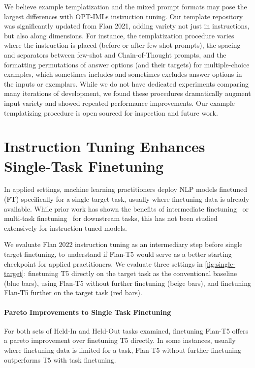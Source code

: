We believe example templatization and the mixed prompt formats may pose the largest differences with OPT-IMLs instruction tuning. Our template repository was significantly updated from Flan 2021, adding variety not just in instructions, but also along dimensions. For instance, the templatization procedure varies where the instruction is placed (before or after few-shot prompts), the spacing and separators between few-shot and Chain-of-Thought prompts, and the formatting permutations of answer options (and their targets) for multiple-choice examples, which sometimes includes and sometimes excludes answer options in the inputs or exemplars. While we do not have dedicated experiments comparing many iterations of development, we found these procedures dramatically augment input variety and showed repeated performance improvements. Our example templatizing procedure is open sourced for inspection and future work.

\section{Instruction Tuning Enhances Single-Task Finetuning}
\label{sec:single-target-ft}

In applied settings, machine learning practitioners deploy NLP models finetuned (FT) specifically for a single target task, usually where finetuning data is already available. While prior work has shown the benefits of intermediate finetuning~\citep{pruksachatkun2020intermediate,vu-etal-2020-exploring} or multi-task finetuning~\citep{aghajanyan-etal-2021-muppet,aribandi2021ext5} for downstream tasks, this has not been studied extensively for instruction-tuned models.

We evaluate Flan 2022 instruction tuning as an intermediary step before single target finetuning, to understand if Flan-T5 would serve as a better starting checkpoint for applied practitioners. We evaluate three settings in \ref{fig:single-target}: finetuning T5 directly on the target task as the conventional baseline (blue bars), using Flan-T5 without further finetuning (beige bars), and finetuning Flan-T5 further on the target task (red bars).

\paragraph{Pareto Improvements to Single Task Finetuning} For both sets of Held-In and Held-Out tasks examined, finetuning Flan-T5 offers a pareto improvement over finetuning T5 directly. In some instances, usually where finetuning data is limited for a task, Flan-T5 without further finetuning outperforms T5 with task finetuning.


